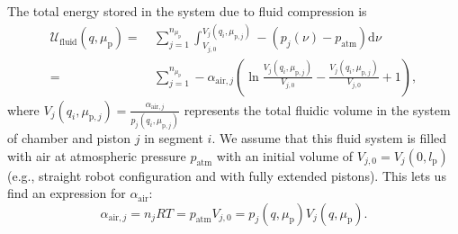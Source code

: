 The total energy stored in the system due to fluid compression is
%
\begin{equation}
\begin{split}
	\mathcal{U}_\mathrm{fluid}(q,\mu_\mathrm{p}) =& \: \sum_{j = 1}^{n_{\mu_\mathrm{p}}} \int_{V_{j,0}}^{V_j(q_i,\mu_{\mathrm{p},j})} -\left ( p_j(\nu) - p_\mathrm{atm} \right ) \mathrm{d} \nu\\
	=&\: \sum_{j=1}^{n_{\mu_\mathrm{p}}} - \alpha_{\mathrm{air},j} \left ( \ln  \frac{V_j(q_i, \mu_{\mathrm{p},j})}{V_{j,0}} - \frac{V_j(q_i, \mu_{\mathrm{p},j})}{V_{j,0}} + 1 \right ),
\end{split}
\end{equation}
%
where $V_j(q_i, \mu_{\mathrm{p},j}) = \frac{\alpha_{\mathrm{air},j}}{p_j(q_i, \mu_{\mathrm{p},j})}$ represents the total fluidic volume in the system of chamber and piston $j$ in segment $i$. We assume that this fluid system is filled with air at atmospheric pressure $p_\mathrm{atm}$ with an initial volume of $V_{j,0} = V_j(0, l_\mathrm{p})$ (e.g., straight robot configuration and with fully extended pistons). 
This lets us find an expression for $\alpha_{\mathrm{air}}$:
\begin{equation}
    \alpha_{\mathrm{air},j} = n_j R T = p_\mathrm{atm} V_{j,0} = p_{j}(q,\mu_\mathrm{p}) V_{j}(q,\mu_\mathrm{p}).
\end{equation}
%

